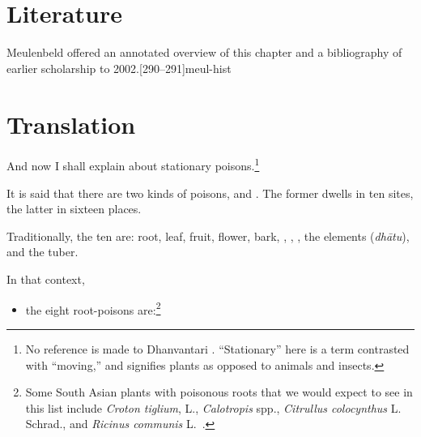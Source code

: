 
\section{Literature}

Meulenbeld offered an annotated overview of this chapter and a bibliography
of earlier scholarship to 2002.[290--291]{meul-hist} 

\section{Translation}

\begin{translation}
    
    \item[1]
    And now I shall explain  about stationary 
    poisons.\footnote{No reference is made to Dhanvantari 
    \citep[see][]{birc-2021}. “Stationary” here is a term contrasted with “moving,” 
    and signifies plants as opposed to animals and insects.}
  
    \item[3]
    \noindent It is said that there are two kinds of poisons,
     and . The former
    dwells in ten sites, the latter in sixteen places.
   
    \item[4]
    Traditionally, the ten are: root, leaf, fruit, flower, bark,
    , , , the
    elements (\emph{dhātu}), and the tuber.

    \item[5]
    
    In that context,\label{poisonousplants}
    \begin{itemize}
        \item the eight root-poisons are:\footnote{Some South Asian
    plants with poisonous roots that we would expect to see in
    this list include \emph{Croton tiglium}, L., \emph{Calotropis}
    spp., \emph{Citrullus colocynthus} L. Schrad., and
    \emph{Ricinus communis} L.\ \citep{pill-2010}.} %
        \begin{enumerate}
            

\end{enumerate}
\end{itemize}
\end{translation}
